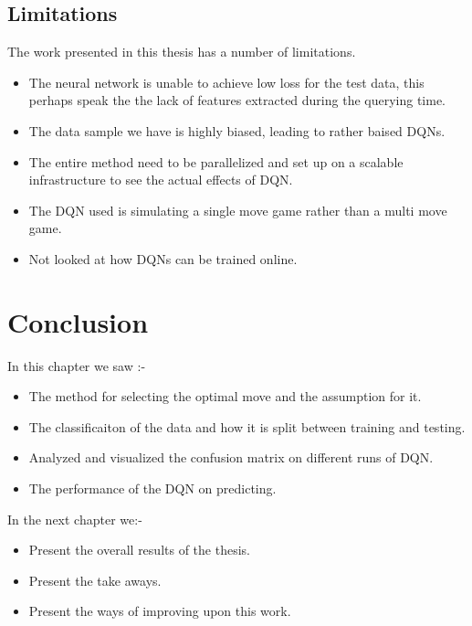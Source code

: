 \subsection{Limitations}
The work presented in this thesis has a number of limitations.
\begin{itemize}
    \item The neural network is unable to achieve low loss for the test data, this perhaps speak the the lack of features extracted during the querying time.
    \item The data sample we have is highly biased, leading to rather baised DQNs.
    \item The entire method need to be parallelized and set up on a scalable infrastructure to see the actual effects of DQN.
    \item The DQN used is simulating a single move game rather than a multi move game.
    \item Not looked at how DQNs can be trained online.
\end{itemize}


\section{Conclusion}
In this chapter we saw :-
\begin{itemize}
    \item The method for selecting the optimal move and the assumption for it.
    \item The classificaiton of the data and how it is split between training and testing.
    \item Analyzed and visualized the confusion matrix on different runs of DQN.
    \item The performance of the DQN on predicting.
\end{itemize}
In the next chapter we:-
\begin{itemize}
    \item Present the overall results of the thesis.
    \item Present the take aways.
    \item Present the ways of improving upon this work.
\end{itemize}
